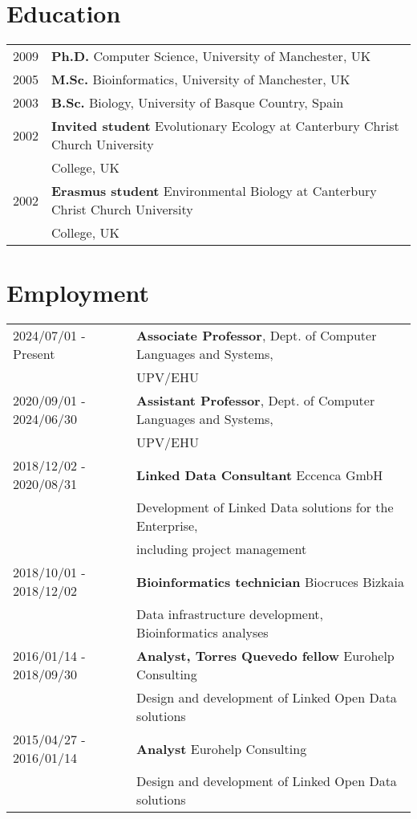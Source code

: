 \documentclass[11pt,fullpage]{article}
\begin{document}

\section*{Education}

\begin{tabular}{ll}
	2009 & {\bf Ph.D.} Computer Science, University of Manchester, UK \\
	2005 & {\bf M.Sc.} Bioinformatics, University of Manchester, UK \\
	2003 & {\bf B.Sc.} Biology, University of Basque Country, Spain \\
	2002 & {\bf Invited student} Evolutionary Ecology at Canterbury Christ Church University \\
	     & College, UK \\
	2002 & {\bf Erasmus student} Environmental Biology at Canterbury Christ Church University \\
	     & College, UK \\
\end{tabular}

\section*{Employment}


\begin{tabular}{ll}
2024/07/01 - Present & {\bf Associate Professor}, Dept. of Computer Languages and Systems, \\
  & UPV/EHU \\
2020/09/01 - 2024/06/30 & {\bf Assistant Professor}, Dept. of Computer Languages and Systems, \\
  & UPV/EHU \\
2018/12/02 - 2020/08/31 & {\bf Linked Data Consultant} Eccenca GmbH \\
      & Development of Linked Data solutions for the Enterprise, \\ 
      & including project management\\
2018/10/01 - 2018/12/02 & {\bf Bioinformatics technician} Biocruces Bizkaia \\
      & Data infrastructure development, Bioinformatics analyses \\
2016/01/14 - 2018/09/30 & {\bf Analyst, Torres Quevedo fellow} Eurohelp Consulting \\
	      & Design and development of Linked Open Data solutions\\
 2015/04/27 -  2016/01/14 & {\bf Analyst} Eurohelp Consulting \\
	    & Design and development of Linked Open Data solutions\\
\end{tabular}
\end{document}
